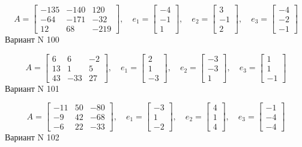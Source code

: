 \documentclass[11pt]{report}
\begin{document}
$$A = \left[\begin{matrix}-135 & -140 & 120\\-64 & -171 & -32\\12 & 68 & -219\end{matrix}\right],\quad e_1 = \left[\begin{matrix}-4\\-1\\1\end{matrix}\right],\quad e_2 = \left[\begin{matrix}3\\-1\\2\end{matrix}\right],\quad e_3 = \left[\begin{matrix}-4\\-2\\-1\end{matrix}\right]$$Вариант N 100

$$A = \left[\begin{matrix}6 & 6 & -2\\13 & 1 & 5\\43 & -33 & 27\end{matrix}\right],\quad e_1 = \left[\begin{matrix}2\\1\\-3\end{matrix}\right],\quad e_2 = \left[\begin{matrix}-3\\-3\\1\end{matrix}\right],\quad e_3 = \left[\begin{matrix}1\\1\\-1\end{matrix}\right]$$Вариант N 101

$$A = \left[\begin{matrix}-11 & 50 & -80\\-9 & 42 & -68\\-6 & 22 & -33\end{matrix}\right],\quad e_1 = \left[\begin{matrix}-3\\1\\-2\end{matrix}\right],\quad e_2 = \left[\begin{matrix}4\\1\\4\end{matrix}\right],\quad e_3 = \left[\begin{matrix}-1\\-4\\-4\end{matrix}\right]$$Вариант N 102
\end{document}
